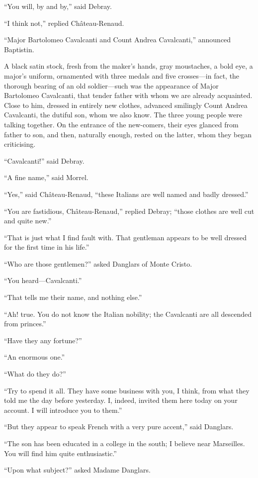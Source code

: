 “You will, by and by,” said Debray.

“I think not,” replied Château-Renaud.

“Major Bartolomeo Cavalcanti and Count Andrea Cavalcanti,” announced
Baptistin.

A black satin stock, fresh from the maker’s hands, gray moustaches, a
bold eye, a major’s uniform, ornamented with three medals and five
crosses—in fact, the thorough bearing of an old soldier—such was the
appearance of Major Bartolomeo Cavalcanti, that tender father with whom
we are already acquainted. Close to him, dressed in entirely new
clothes, advanced smilingly Count Andrea Cavalcanti, the dutiful son,
whom we also know. The three young people were talking together. On the
entrance of the new-comers, their eyes glanced from father to son, and
then, naturally enough, rested on the latter, whom they began
criticising.

“Cavalcanti!” said Debray.

“A fine name,” said Morrel.

“Yes,” said Château-Renaud, “these Italians are well named and badly
dressed.”

“You are fastidious, Château-Renaud,” replied Debray; “those clothes
are well cut and quite new.”

“That is just what I find fault with. That gentleman appears to be well
dressed for the first time in his life.”

“Who are those gentlemen?” asked Danglars of Monte Cristo.

“You heard—Cavalcanti.”

“That tells me their name, and nothing else.”

“Ah! true. You do not know the Italian nobility; the Cavalcanti are all
descended from princes.”

“Have they any fortune?”

“An enormous one.”

“What do they do?”

“Try to spend it all. They have some business with you, I think, from
what they told me the day before yesterday. I, indeed, invited them
here today on your account. I will introduce you to them.”

“But they appear to speak French with a very pure accent,” said
Danglars.

“The son has been educated in a college in the south; I believe near
Marseilles. You will find him quite enthusiastic.”

“Upon what subject?” asked Madame Danglars.

